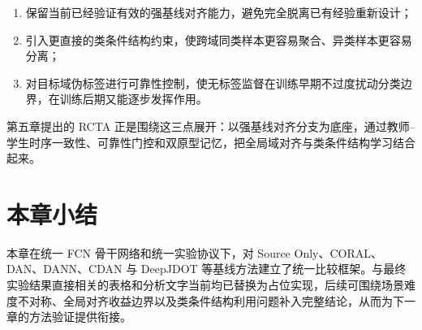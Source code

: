 \begin{enumerate}
\item 保留当前已经验证有效的强基线对齐能力，避免完全脱离已有经验重新设计；
\item 引入更直接的类条件结构约束，使跨域同类样本更容易聚合、异类样本更容易分离；
\item 对目标域伪标签进行可靠性控制，使无标签监督在训练早期不过度扰动分类边界，在训练后期又能逐步发挥作用。
\end{enumerate}

第五章提出的 RCTA 正是围绕这三点展开：以强基线对齐分支为底座，通过教师--学生时序一致性、可靠性门控和双原型记忆，把全局域对齐与类条件结构学习结合起来。

\section{本章小结}
本章在统一 FCN 骨干网络和统一实验协议下，对 Source Only、CORAL、DAN、DANN、CDAN 与 DeepJDOT 等基线方法建立了统一比较框架。与最终实验结果直接相关的表格和分析文字当前均已替换为占位实现，后续可围绕场景难度不对称、全局对齐收益边界以及类条件结构利用问题补入完整结论，从而为下一章的方法验证提供衔接。
